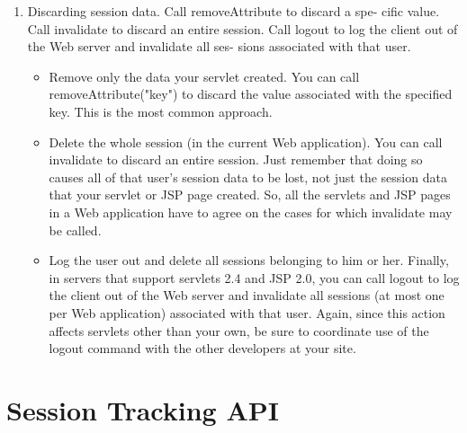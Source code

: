 \documentclass[a4paper,10pt]{scrreprt}
\begin{document}
{\begin{enumerate}
\item Discarding session data. Call removeAttribute to discard a spe- cific value. Call
invalidate to discard an entire session. Call logout to log the client out of the Web server
and invalidate all ses- sions associated with that user.
\begin{itemize}
 \item Remove only the data your servlet created. You can call removeAttribute("key") to
discard the value associated with the specified key. This is the most common approach.
\item Delete the whole session (in the current Web application). You can call invalidate to discard
an entire session. Just remember that doing so causes all of that user’s session data to be lost, not
just the session data that your servlet or JSP page created. So, all the servlets and JSP pages in a
Web application have to agree on the cases for which invalidate may be called.
\item Log the user out and delete all sessions belonging to him or her. Finally, in servers that
support servlets 2.4 and JSP 2.0, you can call logout to log the client out of the Web server and
invalidate all sessions (at most one per Web application) associated with that user. Again, since
this action affects servlets other than your own, be sure to coordinate use of the logout command
with the other developers at your site.
\end{itemize}


\end{enumerate}

\section{Session Tracking API}

}
\end{document}
